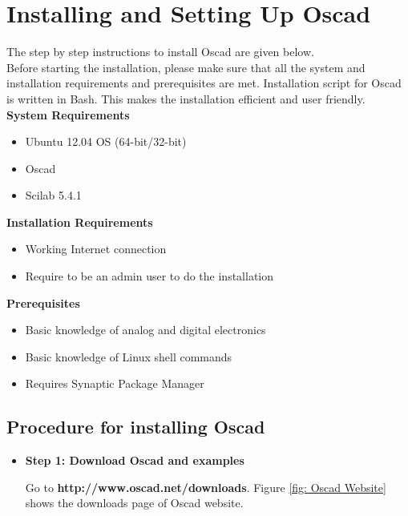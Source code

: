 
\chapter {Installing and Setting Up Oscad}
\label{chap2}
The step by step instructions to install Oscad are given below.\\
Before starting the installation, please make sure that all the system and installation requirements and prerequisites are met. Installation script for Oscad is written in Bash.
This makes the installation efficient and user friendly.  \\
\newline
\textbf{System Requirements}
\begin{itemize}
\item Ubuntu 12.04 OS (64-bit/32-bit)
\item Oscad
\item Scilab 5.4.1
\end{itemize}
\textbf{Installation Requirements}
\begin{itemize}
\item Working Internet connection
\item Require to be an admin user to do the installation
\end{itemize}
\textbf{Prerequisites}
\begin{itemize}
\item Basic knowledge of analog and digital electronics
\item Basic knowledge of Linux shell commands
\item Requires Synaptic Package Manager
\end{itemize}
\section {Procedure for installing Oscad}
\begin{itemize}
\item \textbf{Step 1: Download Oscad and examples} 

Go to \textbf{http://www.oscad.net/downloads}. Figure \ref{fig: Oscad Website} shows the downloads page of Oscad website.\\
\end{itemize}

